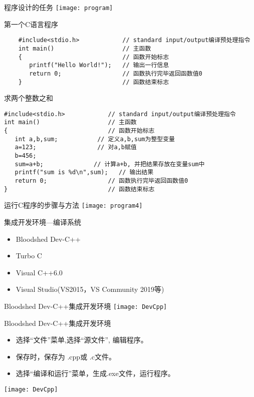 \begin{frame}{程序设计的任务}
\texttt{[image: program]}
\end{frame}

\begin{frame}[fragile]{第一个C语言程序}
    \begin{lstlisting}
    #include<stdio.h>            // standard input/output编译预处理指令
    int main()                   // 主函数
    {                            // 函数开始标志
       printf("Hello World!");   // 输出一行信息
       return 0;                 // 函数执行完毕返回函数值0
    }                            // 函数结束标志
    \end{lstlisting}
\end{frame}

\begin{frame}[fragile]{求两个整数之和}
\begin{lstlisting}
#include<stdio.h>            // standard input/output编译预处理指令
int main()                   // 主函数
{                            // 函数开始标志
   int a,b,sum;           // 定义a,b,sum为整型变量
   a=123;                 // 对a,b赋值
   b=456;
   sum=a+b;              // 计算a+b, 并把结果存放在变量sum中
   printf("sum is %d\n",sum);   // 输出结果
   return 0;                 // 函数执行完毕返回函数值0
}                            // 函数结束标志
\end{lstlisting}
\end{frame}

\begin{frame}{运行C程序的步骤与方法}
\texttt{[image: program4]}
\end{frame}

\begin{frame}{集成开发环境---编译系统}
\begin{itemize}
	\item Bloodshed Dev-C++ 
	\item Turbo C
	\item Visual C++6.0 
	\item Visual Studio(VS2015，VS Community 2019等)
\end{itemize}
\end{frame}

\begin{frame}{Bloodshed Dev-C++集成开发环境}
\texttt{[image: DevCpp]}   
\end{frame}

\begin{frame}{Bloodshed Dev-C++集成开发环境}
\begin{itemize}
	\item 选择“文件”菜单,选择“源文件”, 编辑程序。
	\item 保存时，保存为 .cpp或 .c文件。
	\item 选择“编译和运行”菜单，生成.exe文件，运行程序。  
\end{itemize} 
\texttt{[image: DevCpp]}   
\end{frame}